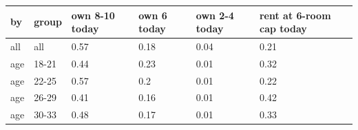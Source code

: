 \begingroup\small
\setlength{\tabcolsep}{3pt}
\renewcommand{\arraystretch}{1.04}
\begin{tabularx}{\linewidth}{XXXXXX}
\toprule
by & group & own 8-10 today & own 6 today & own 2-4 today & rent at 6-room cap today \\
\midrule
all & all & 0.57 & 0.18 & 0.04 & 0.21 \\
age & 18-21 & 0.44 & 0.23 & 0.01 & 0.32 \\
age & 22-25 & 0.57 & 0.2 & 0.01 & 0.22 \\
age & 26-29 & 0.41 & 0.16 & 0.01 & 0.42 \\
age & 30-33 & 0.48 & 0.17 & 0.01 & 0.33 \\
\bottomrule
\end{tabularx}
\endgroup
